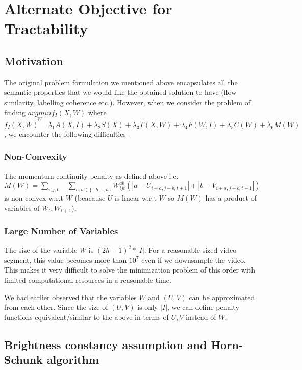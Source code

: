\section{Alternate Objective for Tractability}


\subsection{Motivation}

The original problem formulation we mentioned above encapsulates all
the semantic properties that we would like the obtained solution to
have (flow similarity, labelling coherence etc.). However, when we
consider the problem of finding $\underset{W}{argmin}f_{I}(X,W)$
where $f_{I}(X,W)=\lambda_{1}A(X,I)+\lambda_{2}S(X)+\lambda_{3}T(X,W)+\lambda_{4}F(W,I)+\lambda_{5}C(W)+\lambda_{6}M(W)$,
we encounter the following difficulties -


\subsubsection*{Non-Convexity}

The momentum continuity penalty as defined above i.e. $M(W)=\underset{i,j,t}{\sum}\quad\underset{a,b\in\{-h,..,h\}}{\sum}W_{ijt}^{ab}(|a-\overline{U}_{i+a,j+b,t+1}|+|b-\overline{V}_{i+a,j+b,t+1}|)$
is non-convex w.r.t $W$ (beacause $U$ is linear w.r.t $W$ so $M(W)$
has a product of variables of $W_{t},W_{t+1}$).


\subsubsection*{Large Number of Variables}

The size of the variable $W$ is $(2h+1)^{2}*|I|$. For a reasonable
sized video segment, this value becomes more than $10^{7}$ even if
we downsample the video. This makes it very difficult to solve the
minimization problem of this order with limited computational resources
in a reasonable time.

\medskip{}


We had earlier observed that the variables $W$ and $(U,V)$ can be
approximated from each other. Since the size of $(U,V)$ is only $|I|$,
we can define penalty functions equivalent/similar to the above in
terms of $U,V$ instead of $W$.


\subsection{Brightness constancy assumption and Horn-Schunk algorithm}

